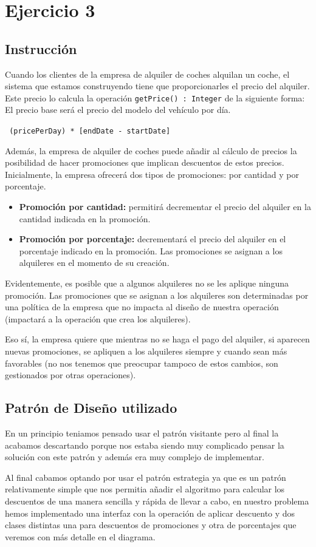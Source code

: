 \section{Ejercicio 3}
\subsection*{Instrucción}
Cuando los clientes de la empresa de alquiler de coches alquilan un coche, el sistema que estamos construyendo
tiene que proporcionarles el precio del alquiler. Este precio lo calcula la operación \texttt{getPrice() : Integer} de la siguiente
forma: El precio base será el precio del modelo del vehículo por día.
\begin{center}
    \texttt{ (pricePerDay) * [endDate - startDate]}
\end{center}
Además, la empresa de alquiler de coches puede añadir al cálculo de precios la posibilidad de hacer promociones
que implican descuentos de estos precios. Inicialmente, la empresa ofrecerá dos tipos de promociones: por cantidad
y por porcentaje.
\begin{itemize}
    \item \textbf{Promoción por cantidad:} permitirá decrementar el precio del alquiler en la cantidad indicada en
    la promoción.
    \item \textbf{Promoción por porcentaje:} decrementará el precio del alquiler en el porcentaje indicado en la
    promoción. Las promociones se asignan a los alquileres en el momento de su creación.
\end{itemize}
Evidentemente, es posible
que a algunos alquileres no se les aplique ninguna promoción. Las promociones que se asignan a los alquileres son
determinadas por una política de la empresa que no impacta al diseño de nuestra operación (impactará a la
operación que crea los alquileres).\par
\vspace{0.15cm}
Eso sí, la empresa quiere que mientras no se haga el pago del alquiler, si aparecen
nuevas promociones, se apliquen a los alquileres siempre y cuando sean más favorables (no nos tenemos que
preocupar tampoco de estos cambios, son gestionados por otras operaciones).


\subsection{Patrón de Diseño utilizado}
En un principio teniamos pensado usar el patrón visitante pero al final la acabamos descartando porque nos estaba siendo muy complicado 
pensar la solución con este patrón y además era muy complejo de implementar.\par
Al final cabamos optando por usar el patrón estrategia ya que es un patrón relativamente simple que nos permitia añadir el algoritmo para calcular 
los descuentos de una manera sencilla y rápida de llevar a cabo, en nuestro problema hemos implementado una interfaz con la operación de 
aplicar descuento y dos clases distintas una para descuentos de promociones y otra de porcentajes que veremos con más detalle en el diagrama. \par

